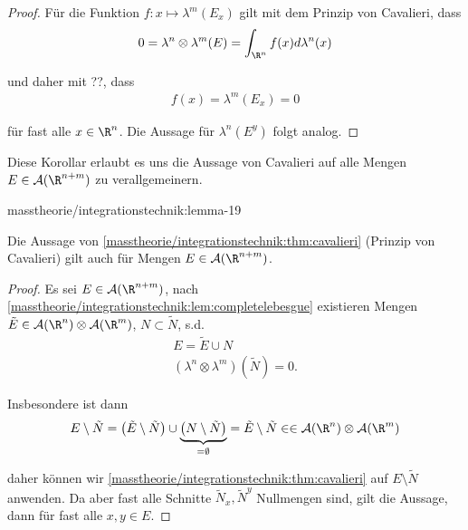 \documentclass[letterpaper,10pt,german]{jupyterBook}
\begin{document}
\begin{proof}
 Für die Funktion \(f:x\mapsto \lambda^m(E_x)\) gilt mit dem Prinzip von Cavalieri, dass
\begin{align*}
0 = \lambda^{n}\otimes\lambda^{m}(E) = \int_{\R^n} f(x)d\lambda^n(x)
\end{align*}
\par
und daher mit ??, dass
\begin{align*}
f(x)=\lambda^m(E_x)=0
\end{align*}
\par
für fast alle \(x\in\R^n\). Die Aussage für \(\lambda^n(E^y)\) folgt analog.
\end{proof}

\par
Diese Korollar erlaubt es uns die Aussage von Cavalieri auf alle Mengen \(E\in \mathcal{A}(\R^{n+m})\) zu verallgemeinern.
\begin{lemma}{}{masstheorie/integrationstechnik:lemma-19}



\par
Die Aussage von \cref{masstheorie/integrationstechnik:thm:cavalieri} (Prinzip von Cavalieri) gilt auch für Mengen \(E\in \mathcal{A}(\R^{n+m})\).
\end{lemma}

\begin{proof}
 Es sei \(E\in \mathcal{A}(\R^{n+m})\), nach \cref{masstheorie/integrationstechnik:lem:completelebesgue} existieren Mengen \(\tilde{E}\in\mathcal{A}(\R^n)\otimes\mathcal{A}(\R^m)\), \(N\subset \tilde{N}\), s.d.
\begin{align*}
E = \tilde{E}\cup N\\
(\lambda^n\otimes\lambda^m)(\tilde{N}) = 0.
\end{align*}
\par
Insbesondere ist dann
\begin{align*}
E\setminus \tilde{N} = \left(\tilde{E}\setminus \tilde{N} \right)\cup \underbrace{\left(N\setminus \tilde{N}\right)}_{=\emptyset} = 
\tilde{E}\setminus \tilde{N}\in \in\mathcal{A}(\R^n)\otimes\mathcal{A}(\R^m)
\end{align*}
\par
daher können wir \cref{masstheorie/integrationstechnik:thm:cavalieri} auf \(E\setminus \tilde{N}\) anwenden. Da aber fast alle Schnitte \(\tilde{N}_x,\tilde{N}^y\) Nullmengen sind, gilt die Aussage, dann für fast alle \(x,y\in E\).
\end{proof}
\end{document}
